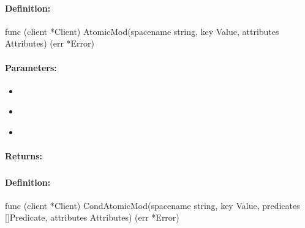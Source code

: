 \paragraph{Definition:}
\begin{gocode}
func (client *Client) AtomicMod(spacename string, key Value, attributes Attributes) (err *Error)
\end{gocode}

\paragraph{Parameters:}
\begin{itemize}[noitemsep]
\item {}\\

\item {}\\

\item {}\\

\end{itemize}

\paragraph{Returns:}


\pagebreak
\subsubsection{}
\label{api:Go:CondAtomicMod}


\paragraph{Definition:}
\begin{gocode}
func (client *Client) CondAtomicMod(spacename string, key Value, predicates []Predicate, attributes Attributes) (err *Error)
\end{gocode}


